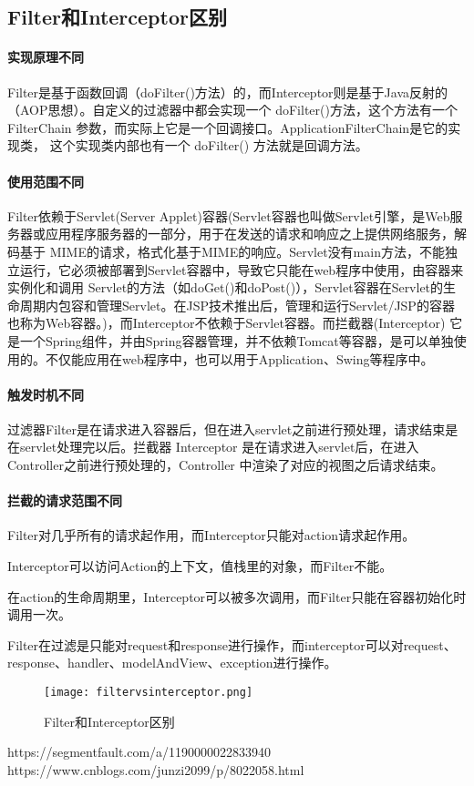 \documentclass[../../../interview-questions.tex]{subfiles}
\begin{document}
\subsection{Filter和Interceptor区别}

\paragraph{实现原理不同}

Filter是基于函数回调（doFilter()方法）的，而Interceptor则是基于Java反射的（AOP思想）。自定义的过滤器中都会实现一个 doFilter()方法，这个方法有一个FilterChain 参数，而实际上它是一个回调接口。ApplicationFilterChain是它的实现类， 这个实现类内部也有一个 doFilter() 方法就是回调方法。

\paragraph{使用范围不同}

Filter依赖于Servlet(Server Applet)容器(Servlet容器也叫做Servlet引擎，是Web服务器或应用程序服务器的一部分，用于在发送的请求和响应之上提供网络服务，解码基于 MIME的请求，格式化基于MIME的响应。Servlet没有main方法，不能独立运行，它必须被部署到Servlet容器中，导致它只能在web程序中使用，由容器来实例化和调用 Servlet的方法（如doGet()和doPost()），Servlet容器在Servlet的生命周期内包容和管理Servlet。在JSP技术推出后，管理和运行Servlet/JSP的容器也称为Web容器。)，而Interceptor不依赖于Servlet容器。而拦截器(Interceptor) 它是一个Spring组件，并由Spring容器管理，并不依赖Tomcat等容器，是可以单独使用的。不仅能应用在web程序中，也可以用于Application、Swing等程序中。

\paragraph{触发时机不同}

过滤器Filter是在请求进入容器后，但在进入servlet之前进行预处理，请求结束是在servlet处理完以后。拦截器 Interceptor 是在请求进入servlet后，在进入Controller之前进行预处理的，Controller 中渲染了对应的视图之后请求结束。

\paragraph{拦截的请求范围不同}

Filter对几乎所有的请求起作用，而Interceptor只能对action请求起作用。

Interceptor可以访问Action的上下文，值栈里的对象，而Filter不能。

在action的生命周期里，Interceptor可以被多次调用，而Filter只能在容器初始化时调用一次。

Filter在过滤是只能对request和response进行操作，而interceptor可以对request、response、handler、modelAndView、exception进行操作。

\begin{figure}[htbp]
	\centering
	\texttt{[image: filtervsinterceptor.png]}
	\caption{Filter和Interceptor区别}
	\label{fig:filtervsinterceptor}
\end{figure}


https://segmentfault.com/a/1190000022833940
https://www.cnblogs.com/junzi2099/p/8022058.html
\end{document}
